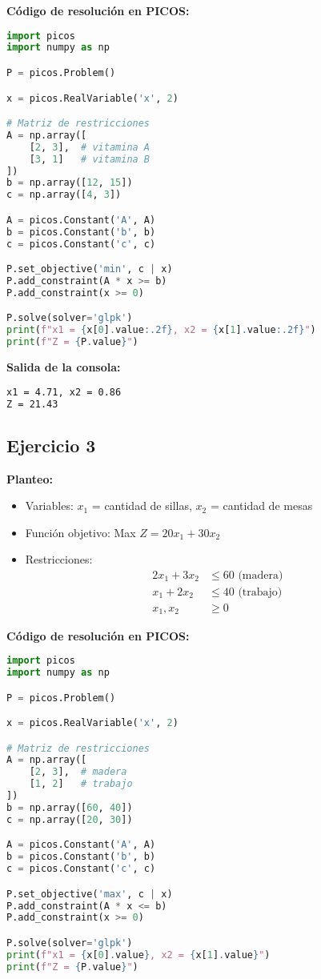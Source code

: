 \documentclass[12pt]{article}
\begin{document}
\textbf{Código de resolución en PICOS:}
\begin{lstlisting}[language=Python]
import picos
import numpy as np

P = picos.Problem()

x = picos.RealVariable('x', 2)

# Matriz de restricciones
A = np.array([
    [2, 3],  # vitamina A
    [3, 1]   # vitamina B
])
b = np.array([12, 15])
c = np.array([4, 3])

A = picos.Constant('A', A)
b = picos.Constant('b', b)
c = picos.Constant('c', c)

P.set_objective('min', c | x)
P.add_constraint(A * x >= b)
P.add_constraint(x >= 0)

P.solve(solver='glpk')
print(f"x1 = {x[0].value:.2f}, x2 = {x[1].value:.2f}")
print(f"Z = {P.value}")
\end{lstlisting}

\textbf{Salida de la consola:}
\begin{lstlisting}[language=bash,backgroundcolor=\color{black},basicstyle=\color{white}\ttfamily,numbers=none]
x1 = 4.71, x2 = 0.86
Z = 21.43
\end{lstlisting}

\subsection{Ejercicio 3}

\textbf{Planteo:}
\begin{itemize}
\item Variables: $x_1$ = cantidad de sillas, $x_2$ = cantidad de mesas
\item Función objetivo: Max $Z = 20x_1 + 30x_2$
\item Restricciones:
  \begin{align*}
  2x_1 + 3x_2 &\leq 60 \text{ (madera)} \\
  x_1 + 2x_2 &\leq 40 \text{ (trabajo)} \\
  x_1, x_2 &\geq 0
  \end{align*}
\end{itemize}

\textbf{Código de resolución en PICOS:}
\begin{lstlisting}[language=Python]
import picos
import numpy as np

P = picos.Problem()

x = picos.RealVariable('x', 2)

# Matriz de restricciones
A = np.array([
    [2, 3],  # madera
    [1, 2]   # trabajo
])
b = np.array([60, 40])
c = np.array([20, 30])

A = picos.Constant('A', A)
b = picos.Constant('b', b)
c = picos.Constant('c', c)

P.set_objective('max', c | x)
P.add_constraint(A * x <= b)
P.add_constraint(x >= 0)

P.solve(solver='glpk')
print(f"x1 = {x[0].value}, x2 = {x[1].value}")
print(f"Z = {P.value}")
\end{lstlisting}
\end{document}
